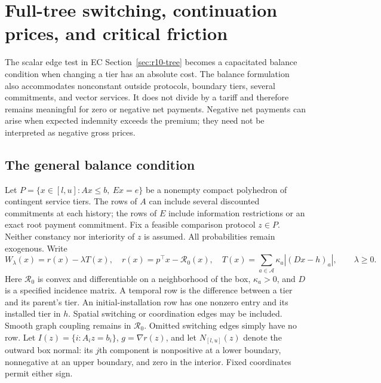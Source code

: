 \section{Full-tree switching, continuation prices, and critical friction}\label{sec:r12-network}
The scalar edge test in EC Section~\ref{sec:r10-tree} becomes a capacitated balance condition when changing a tier has an absolute cost. The balance formulation also accommodates nonconstant outside protocols, boundary tiers, several commitments, and vector services. It does not divide by a tariff and therefore remains meaningful for zero or negative net payments. Negative net payments can arise when expected indemnity exceeds the premium; they need not be interpreted as negative gross prices.

\subsection{The general balance condition}
Let $P=\{x\in[l,u]:Ax\leq b,\ Ex=e\}$ be a nonempty compact polyhedron of contingent service tiers. The rows of $A$ can include several discounted commitments at each history; the rows of $E$ include information restrictions or an exact root payment commitment. Fix a feasible comparison protocol $z\in P$. Neither constancy nor interiority of $z$ is assumed. All probabilities remain exogenous. Write
\begin{equation}\label{eq:r12-problem}
 W_\lambda(x)=r(x)-\lambda T(x),\quad r(x)=p^\top x-\mathcal R_0(x),\quad
 T(x)=\sum_{a\in\mathcal A}\kappa_a |(Dx-h)_a|,
 \qquad\lambda\geq0.
\end{equation}
Here $\mathcal R_0$ is convex and differentiable on a neighborhood of the box, $\kappa_a>0$, and $D$ is a specified incidence matrix. A temporal row is the difference between a tier and its parent's tier. An initial-installation row has one nonzero entry and its installed tier in $h$. Spatial switching or coordination edges may be included. Smooth graph coupling remains in $\mathcal R_0$. Omitted switching edges simply have no row. Let $I(z)=\{i:A_i z=b_i\}$, $g=\nabla r(z)$, and let $N_{[l,u]}(z)$ denote the outward box normal: its $j$th component is nonpositive at a lower boundary, nonnegative at an upper boundary, and zero in the interior. Fixed coordinates permit either sign.

